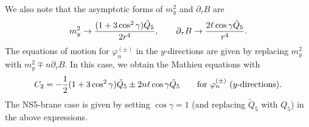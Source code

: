 \documentclass[a4paper,12pt]{article}
\begin{document}
We also note that the  asymptotic forms of $m^{2}_{y}$
and $\partial_{\tau}B$ are
\begin{equation}
m^{2}_{y}\rightarrow {(1+3\cos^2\gamma)\tilde{Q}_{5}\over
2 r^{4}},\qquad
\partial_\tau B\rightarrow {2\ell\cos\gamma\tilde{Q}_{5}
\over r^4}.
\end{equation}
The equations of motion for $\varphi^{(\pm)}_{n}$ in
the $y$-directions are given by replacing 
$m^{2}_{y}$ with $m^{2}_{y}\mp n\partial_\tau B$.
In this case, we obtain the Mathieu equations with 
\begin{equation}
C_{2}=-{1\over 2}(1+3\cos^2\gamma)\tilde{Q}_{5}\pm 
2n\ell\cos\gamma\tilde{Q}_{5}\qquad  
\mbox{for $\varphi_{n}^{(\pm)}$ ($y$-directions)}.
\end{equation}
The NS5-brane case is given by setting $\cos\gamma=1$
(and replacing $\tilde{Q}_{5}$ with $Q_{5}$)
in the above expressions.
\end{document}

